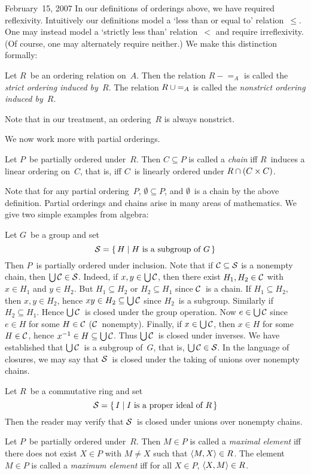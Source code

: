 \begin{lecture}{February~15, 2007}
In our definitions of orderings above, we have required reflexivity. Intuitively our definitions model a `less than or equal to' relation~\(\le\). One may instead model a `strictly less than' relation~\(<\) and require irreflexivity. (Of course, one may alternately require neither.) We make this distinction formally:
\begin{defn}
Let \(R\)~be an ordering relation on~\(A\). Then the relation \(R-{=}_A\) is called the \emph{strict ordering induced by~\(R\)}. The relation \(R\cup{=}_A\) is called the \emph{nonstrict ordering induced by~\(R\)}.
\end{defn}
\noindent Note that in our treatment, an ordering~\(R\) is always nonstrict.

We now work more with partial orderings.
\begin{defn}
Let \(P\)~be partially ordered under~\(R\). Then \(C\subseteq P\) is called a \emph{chain} iff \(R\)~induces a linear ordering on~\(C\), that is, iff \(C\)~is linearly ordered under \(R\cap(C\times C)\).
\end{defn}
\noindent Note that for any partial ordering~\(P\), \(\emptyset\subseteq P\), and \(\emptyset\)~is a chain by the above definition. Partial orderings and chains arise in many areas of mathematics. We give two simple examples from algebra:
\begin{example}
Let \(G\)~be a group and set
\[\mathcal{S}=\{\,H\mid H\text{ is a subgroup of }G\,\}\]
Then \(P\)~is partially ordered under inclusion. Note that if \(\mathcal{C}\subseteq\mathcal{S}\) is a nonempty chain, then \(\bigcup\mathcal{C}\in\mathcal{S}\). Indeed, if \(x,y\in\bigcup\mathcal{C}\), then there exist \(H_1,H_2\in\mathcal{C}\) with \(x\in H_1\) and \(y\in H_2\). But \(H_1\subseteq H_2\) or \(H_2\subseteq H_1\) since \(\mathcal{C}\)~is a chain. If \(H_1\subseteq H_2\), then \(x,y\in H_2\), hence \(xy\in H_2\subseteq\bigcup\mathcal{C}\) since \(H_2\)~is a subgroup. Similarly if \(H_2\subseteq H_1\). Hence \(\bigcup\mathcal{C}\)~is closed under the group operation. Now \(e\in\bigcup\mathcal{C}\) since \(e\in H\) for some \(H\in\mathcal{C}\) (\(\mathcal{C}\)~nonempty). Finally, if \(x\in\bigcup\mathcal{C}\), then \(x\in H\) for some \(H\in\mathcal{C}\), hence \(x^{-1}\in H\subseteq\bigcup\mathcal{C}\). Thus \(\bigcup\mathcal{C}\)~is closed under inverses. We have established that \(\bigcup\mathcal{C}\)~is a subgroup of~\(G\), that is, \(\bigcup\mathcal{C}\in\mathcal{S}\). In the language of closures, we may say that \(\mathcal{S}\)~is closed under the taking of unions over nonempty chains.
\end{example}
\begin{example}
Let \(R\)~be a commutative ring and set
\[\mathcal{S}=\{\,I\mid I\text{ is a proper ideal of }R\,\}\]
Then the reader may verify that \(\mathcal{S}\)~is closed under unions over nonempty chains.
\end{example}
\begin{defn}
Let \(P\)~be partially ordered under~\(R\). Then \(M\in P\) is called a \emph{maximal element} iff there does not exist \(X\in P\) with \(M\ne X\) such that \(\langle{M},{X}\rangle\in R\). The element \(M\in P\) is called a \emph{maximum element} iff for all \(X\in P\), \(\langle{X},{M}\rangle\in R\).


\end{defn}
\end{lecture}
